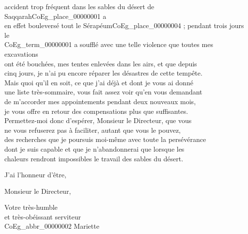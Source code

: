 \documentclass{book}
\begin{document}
accident trop fréquent dans les sables du désert de Saqqarah\gls{CoEg_place_00000001} a\\
en effet bouleversé tout le Sérapéum\gls{CoEg_place_00000004} ; pendant trois jours le\\
\Gls{CoEg_term_00000001} a soufflé avec une telle violence que toutes mes excavations\\
ont été bouchées, mes tentes enlevées dans les airs, et que depuis\\
cinq jours, je n’ai pu encore réparer les désastres de cette tempête.\\
\indent Mais quoi qu’il en soit, ce que j’ai déjà et dont je vous ai donné\\
une liste très-sommaire, vous fait assez voir qu’en vous demandant\\
de m’accorder mes appointements pendant deux nouveaux mois,\\
je vous offre en retour des compensations plus que suffisantes.\\
\indent Permettez-moi donc d’espérer, Monsieur le Directeur, que vous\\
ne vous refuserez pas à faciliter, autant que vous le pouvez,\\
des recherches que je poursuis moi-même avec toute la persévérance\\
dont je suis capable et que je n’abandonnerai que lorsque les\\
chaleurs rendront impossibles le travail des sables du désert.
\par J’ai l’honneur d’être,
\begin{center} Monsieur le Directeur,\end{center}
\begin{center} \hspace{5cm}Votre très-humble\\
\hspace{5cm}et très-obéissant serviteur\\
\hspace{5cm} \gls{CoEg_abbr_00000002} Mariette\end{center}
\end{document}
